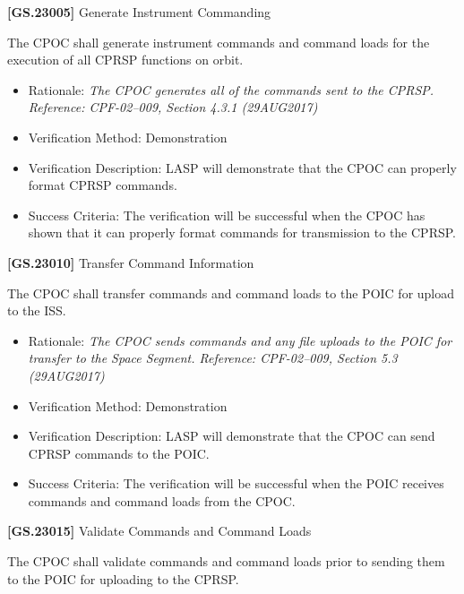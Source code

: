 \documentclass[12pt,oneside,oldfontcommands]{memoir}
\begin{document}
\label{tbx_1}

\textbf{[GS.23005]} Generate Instrument Commanding

The \gls{CPOC} shall generate instrument commands and command loads for the execution of all \gls{CPRSP} functions on orbit.

\begin{itemize}
\item{} Rationale: \emph{The CPOC generates all of the commands sent to the CPRSP. Reference: CPF-02--009, Section 4.3.1 (29AUG2017)}

\item{} Verification Method: Demonstration

\item{} Verification Description: \gls{LASP} will demonstrate that the \gls{CPOC} can properly format \gls{CPRSP} commands.

\item{} Success Criteria: The verification will be successful when the \gls{CPOC} has shown that it can properly format commands for transmission to the \gls{CPRSP}.

\end{itemize}

\textbf{[GS.23010]} Transfer Command Information

The \gls{CPOC} shall transfer commands and command loads to the \gls{POIC} for upload to the \gls{ISS}.

\begin{itemize}
\item{} Rationale: \emph{The CPOC sends commands and any file uploads to the POIC for transfer to the Space Segment. Reference: CPF-02--009, Section 5.3 (29AUG2017)}

\item{} Verification Method: Demonstration

\item{} Verification Description: \gls{LASP} will demonstrate that the \gls{CPOC} can send \gls{CPRSP} commands to the \gls{POIC}.

\item{} Success Criteria: The verification will be successful when the \gls{POIC} receives commands and command loads from the \gls{CPOC}.

\end{itemize}

\textbf{[GS.23015]} Validate Commands and Command Loads

The \gls{CPOC} shall validate commands and command loads prior to sending them to the \gls{POIC} for uploading to the \gls{CPRSP}.
\end{document}
